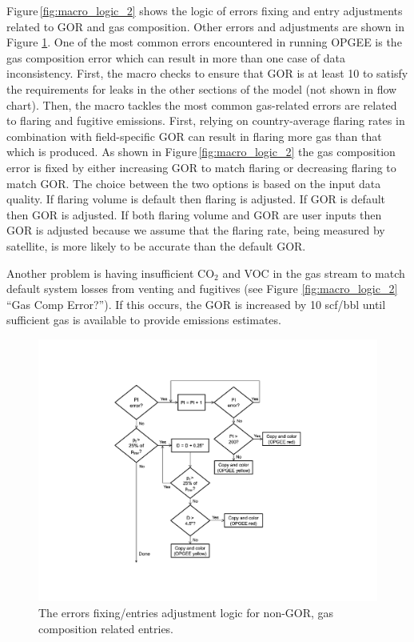 \documentclass[11pt]{report}
\begin{document}
Figure\,\ref{fig:macro_logic_2} shows the logic of errors fixing and entry adjustments related to GOR and gas composition. Other errors and adjustments are shown in Figure \ref{fig:macro_logic_3}. One of the most common errors encountered in running OPGEE is the gas composition error which can result in more than one case of data inconsistency. First, the macro checks to ensure that GOR is at least 10 to satisfy the requirements for leaks in the other sections of the model (not shown in flow chart). Then, the macro tackles the most common gas-related errors are related to flaring and fugitive emissions. First, relying on country-average flaring rates in combination with field-specific GOR can result in flaring more gas than that which is produced. As shown in Figure\,\ref{fig:macro_logic_2} the gas composition error is fixed by either increasing GOR to match flaring or decreasing flaring to match GOR. The choice between the two options is based on the input data quality. If flaring volume is default then flaring is adjusted. If GOR is default then GOR is adjusted. If both flaring volume and GOR are user inputs then GOR is adjusted because we assume that the flaring rate, being measured by satellite, is more likely to be accurate than the default GOR.

Another problem is having insufficient CO$_{2}$ and VOC in the gas stream to match default system losses from venting and fugitives (see Figure \ref{fig:macro_logic_2} ``Gas Comp Error?''). If this occurs, the GOR is increased by 10 scf/bbl until sufficient gas is available to provide emissions estimates.


\begin{figure}[t]
\includegraphics[width=0.8\columnwidth]{images/macro_logic_3.pdf}
\caption{The errors fixing/entries adjustment logic for non-GOR, gas composition related entries.}
\label{fig:macro_logic_3}
\end{figure}
\end{document}
